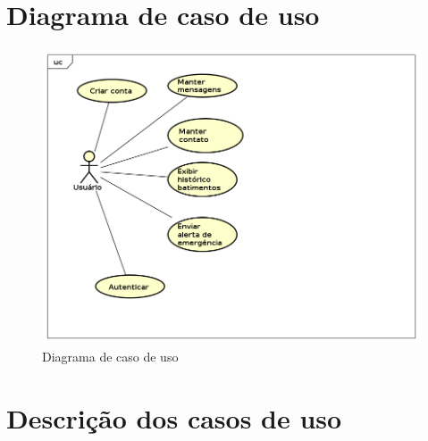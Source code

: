 \documentclass[
	12pt,				%
	openright,			%
	oneside,			%
	a4paper,			%
	english,			%
	french,				%
	spanish,			%
	brazil				%
]{abntex2}
\begin{document}
\chapter{Diagrama de caso de uso}
\begin{figure}[h]
	\label{figure_diagrama_caso_uso}
	\caption{Diagrama de caso de uso}
	\includegraphics[scale=0.6]{UseCase.png}
	\hfill
\end{figure}
\chapter{Descrição dos casos de uso}
%

%

%

%

%

%

%
\end{document}
